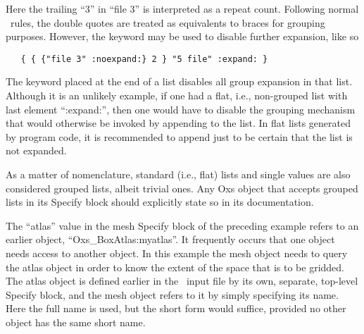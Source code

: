 Here the trailing ``3'' in ``file 3'' is interpreted as a repeat count.
Following normal \Tcl\ rules, the double quotes are treated as equivalents
to braces for grouping purposes.  However, the keyword 
may be used to disable further expansion, like so
\begin{verbatim}
   { { {"file 3" :noexpand:} 2 } "5 file" :expand: }
\end{verbatim}
The  keyword placed at the end of a list disables all
group expansion in that list.  Although it is an unlikely example,
if one had a flat, i.e., non-grouped list with last element ``:expand:'',
then one would have to disable the grouping mechanism that would
otherwise be invoked by appending  to the list.  In
flat lists generated by program code, it is recommended to append
 just to be certain that the list is not expanded.

As a matter of nomenclature, standard (i.e., flat) lists and single
values are also considered grouped lists, albeit trivial ones.  Any Oxs
object that accepts grouped lists in its Specify block should explicitly
state so in its documentation.

%
\label{par:oxsExtReferencing}
The ``atlas'' value in the mesh Specify block of the preceding example
refers to an earlier  object, ``Oxs\_BoxAtlas:myatlas''.
It frequently occurs that one  object needs access to
another  object.  In this example the mesh object
 needs to query the atlas object  in order to
know the extent of the space that is to be gridded.  The atlas object is
defined earlier in the \MIF\ input file by its own, separate, top-level
Specify block, and the mesh object refers to it by simply specifying its
name.  Here the full name is used, but the short form 
would suffice, provided no other  object has the same short
name.

